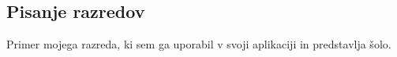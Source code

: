 {\color{indiagreen}\subsection{Pisanje razredov}}
Primer mojega razreda, ki sem ga uporabil v svoji aplikaciji in predstavlja šolo.
